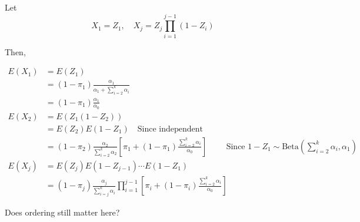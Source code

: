 \documentclass[10pt]{article}
\theoremstyle{definition}
\begin{document}

Let
$$X_1 = Z_1, \quad X_j = Z_j \prod_{i = 1}^{j-1}( 1- Z_i)$$


Then,

\begin{align*}
  E(X_1) &= E(Z_1) \\
  &= (1 - \pi_1) \frac{\alpha_1}{\alpha_1 + \sum_{i = 2}^k \alpha_i }\\
  &= (1 - \pi_1) \frac{\alpha_1}{\alpha_0}\\
  E(X_2) &= E(Z_1(1-Z_2))\\
  &= E(Z_2)E(1 - Z_1) \quad \text{Since independent}\\
  &= (1 - \pi_2) \frac{\alpha_2}{\sum_{i = 2}^k \alpha_2} \left[ \pi_1 +  (1 - \pi_1)\frac{\sum_{i = 2}^k \alpha_i}{\alpha_0} \right] \qquad \text{ Since } 1 - Z_1 \sim \text{Beta}(\sum_{i = 2}^k \alpha_i, \alpha_1)\\
  E(X_j) &= E(Z_j)E(1 - Z_{j-1})\cdots E(1 - Z_1)\\
  &= (1 - \pi_j) \frac{\alpha_j}{\sum_{i = j}^k \alpha_i} \prod_{i = 1}^{j-1} \left[ \pi_i +  (1 - \pi_i)\frac{\sum_{i = 2}^k \alpha_i}{\alpha_0} \right] 
\end{align*}

Does ordering still matter here?



%
\end{document}
